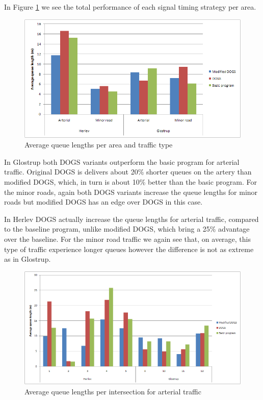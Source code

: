 In Figure \ref{fig:aveq_detail} we see the total performance of each signal timing strategy per area. 

\begin{figure}[ht]
\centering
\includegraphics[scale=0.40]{aveq_total_area_vs_traffic-type.png}
\caption{Average queue lengths per area and traffic type}
\label{fig:aveq_detail}
\end{figure}

In Glostrup both DOGS variants outperform the basic program for arterial traffic. Original DOGS is delivers about 20\% shorter queues on the artery than modified DOGS, which, in turn is about 10\% better than the basic program. For the minor roads, again both DOGS variants increase the queue lengths for minor roads but modified DOGS has an edge over DOGS in this case.

In Herlev DOGS actually increase the queue lengths for arterial traffic, compared to the baseline program, unlike modified DOGS, which bring a 25\% advantage over the baseline. For the minor road traffic we again see that, on average, this type of traffic experience longer queues however the difference is not as extreme as in Glostrup.

\begin{figure}[ht]
\centering
\includegraphics[scale=0.30]{aveq_intersection_arterial.png}
\caption{Average queue lengths per intersection for arterial traffic}
\label{fig:aveq_int_art}
\end{figure}

